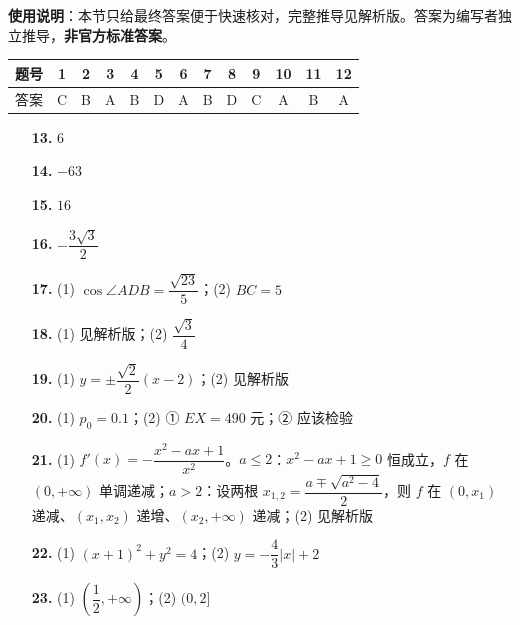 
\begin{gknotice}
\textbf{使用说明}：本节只给最终答案便于快速核对，完整推导见解析版。答案为编写者独立推导，\textbf{非官方标准答案}。
\end{gknotice}

\begin{center}\begin{tabular}{ccccccccccccc}
\toprule
题号 & 1 & 2 & 3 & 4 & 5 & 6 & 7 & 8 & 9 & 10 & 11 & 12 \\
\midrule
答案 & C & B & A & B & D & A & B & D & C & A & B & A \\
\bottomrule
\end{tabular}\end{center}

\begin{itemize}[leftmargin=2.6em]
  \item[\textbf{13.}] $6$
  \item[\textbf{14.}] $-63$
  \item[\textbf{15.}] $16$
  \item[\textbf{16.}] $-\dfrac{3\sqrt3}2$
\end{itemize}

\begin{itemize}[leftmargin=2.6em]
  \item[\textbf{17.}] (1) $\cos\angle ADB=\dfrac{\sqrt{23}}5$；(2) $BC=5$
  \item[\textbf{18.}] (1) 见解析版；(2) $\dfrac{\sqrt3}4$
  \item[\textbf{19.}] (1) $y=\pm\dfrac{\sqrt2}2(x-2)$；(2) 见解析版
  \item[\textbf{20.}] (1) $p_0=0.1$；(2) ① $EX=490$ 元；② 应该检验
  \item[\textbf{21.}] (1) $f'(x)=-\dfrac{x^{2}-ax+1}{x^{2}}$。$a\le2$：$x^{2}-ax+1\ge0$ 恒成立，$f$ 在 $(0,+\infty)$ 单调递减；$a>2$：设两根 $x_{1,2}=\dfrac{a\mp\sqrt{a^{2}-4}}2$，则 $f$ 在 $\left(0,x_1\right)$ 递减、$\left(x_1,x_2\right)$ 递增、$\left(x_2,+\infty\right)$ 递减；(2) 见解析版
\end{itemize}

\begin{itemize}[leftmargin=2.6em]
  \item[\textbf{22.}] (1) $(x+1)^{2}+y^{2}=4$；(2) $y=-\dfrac43|x|+2$
  \item[\textbf{23.}] (1) $\left(\dfrac12,+\infty\right)$；(2) $(0,2]$
\end{itemize}
